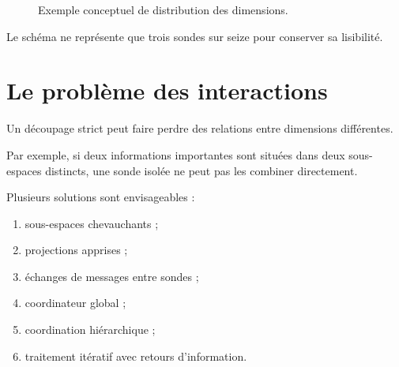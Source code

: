 \documentclass[11pt,a4paper]{report}
\begin{document}
\begin{figure}[H]
\centering
{}
\caption{Exemple conceptuel de distribution des dimensions.}
\end{figure}

Le schéma ne représente que trois sondes sur seize
pour conserver sa lisibilité.

\section{Le problème des interactions}

Un découpage strict peut faire perdre des relations
entre dimensions différentes.

Par exemple, si deux informations importantes sont situées
dans deux sous-espaces distincts, une sonde isolée ne peut
pas les combiner directement.

Plusieurs solutions sont envisageables :

\begin{enumerate}
  \item sous-espaces chevauchants ;
  \item projections apprises ;
  \item échanges de messages entre sondes ;
  \item coordinateur global ;
  \item coordination hiérarchique ;
  \item traitement itératif avec retours d'information.
\end{enumerate}
\end{document}
